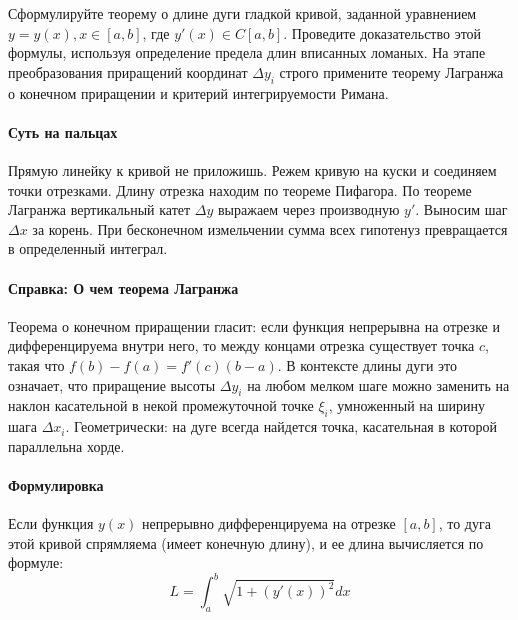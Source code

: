 {Сформулируйте теорему о длине дуги гладкой кривой, заданной уравнением $y = y(x), x \in [a, b]$, где $y'(x) \in C[a, b]$. Проведите доказательство этой формулы, используя определение предела длин вписанных ломаных. На этапе преобразования приращений координат $\Delta y_i$ строго примените теорему Лагранжа о конечном приращении и критерий интегрируемости Римана.}

\paragraph{Суть на пальцах}
Прямую линейку к кривой не приложишь. Режем кривую на куски и соединяем точки отрезками. Длину отрезка находим по теореме Пифагора. По теореме Лагранжа вертикальный катет $\Delta y$ выражаем через производную $y'$. Выносим шаг $\Delta x$ за корень. При бесконечном измельчении сумма всех гипотенуз превращается в определенный интеграл.

\paragraph{Справка: О чем теорема Лагранжа}
Теорема о конечном приращении гласит: если функция непрерывна на отрезке и дифференцируема внутри него, то между концами отрезка существует точка $c$, такая что $f(b) - f(a) = f'(c)(b - a)$. В контексте длины дуги это означает, что приращение высоты $\Delta y_i$ на любом мелком шаге можно заменить на наклон касательной в некой промежуточной точке $\xi_i$, умноженный на ширину шага $\Delta x_i$. Геометрически: на дуге всегда найдется точка, касательная в которой параллельна хорде.

\paragraph{Формулировка}
Если функция $y(x)$ непрерывно дифференцируема на отрезке $[a, b]$, то дуга этой кривой спрямляема (имеет конечную длину), и ее длина вычисляется по формуле:
$$L = \int_a^b \sqrt{1 + (y'(x))^2} dx$$

